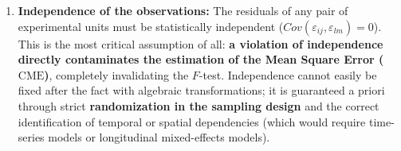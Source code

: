 \begin{enumerate}
	\item \textbf{Independence of the observations:} The residuals of any pair of experimental units must be statistically independent ($Cov(\varepsilon_{ij}, \varepsilon_{lm}) = 0$). This is the most critical assumption of all: \textbf{a violation of independence directly contaminates the estimation of the Mean Square Error ($\text{CME}$)}, completely invalidating the $F$-test. Independence cannot easily be fixed after the fact with algebraic transformations; it is guaranteed a priori through strict \textbf{randomization in the sampling design} and the correct identification of temporal or spatial dependencies (which would require time-series models or longitudinal mixed-effects models).
\end{enumerate}
